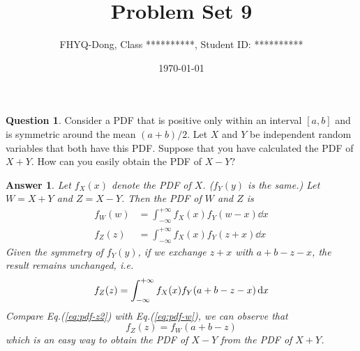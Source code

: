 \documentclass[utf8]{article}
\title{Problem Set 9}
\author{ FHYQ-Dong, Class **********, Student ID: ********** }
\date{\today}
\theoremstyle{definition}%
\newtheorem{question}{Question} %
\theoremstyle{plain}%
\newtheorem{answer}{Answer} %
\begin{document}
\maketitle
\thispagestyle{fancy}

\begin{question}
    Consider a PDF that is positive only within an interval $[a, b]$ and is symmetric around the mean $(a + b)/2$. Let $X$ and $Y$ be independent random variables that both have this PDF. Suppose that you have calculated the PDF of $X + Y$. How can you easily obtain the PDF of $X - Y$?
\end{question}
\begin{answer}
Let $f_{X}(x)$ denote the PDF of $X$. ($f_{Y}(y)$ is the same.) Let $W = X + Y$ and $Z = X - Y$. Then the PDF of $W$ and $Z$ is
\begin{align}
    \label{eq:pdf-w}
    f_{W}(w) &= \int_{-\infty}^{+\infty} f_{X}(x) f_{Y}(w - x) \dd{x} \\ 
    \label{eq:pdf-z1}
    f_{Z}(z) &= \int_{-\infty}^{+\infty} f_{X}(x) f_{Y}(z + x) \dd{x}
\end{align}
Given the symmetry of $f_{Y}(y)$, if we exchange $z + x$ with $a + b - z - x$, the result remains unchanged, i.e.
\begin{equation}
    \label{eq:pdf-z2}
    f_{Z}(z) = \int_{-\infty}^{+\infty} f_{X}(x) f_{Y}\qty(a + b - z - x) \dd{x}
\end{equation}
Compare Eq.(\ref{eq:pdf-z2}) with Eq.(\ref{eq:pdf-w}), we can observe that
\begin{equation}
    f_{Z}(z) = f_{W}(a + b - z)
\end{equation}
which is an easy way to obtain the PDF of $X - Y$ from the PDF of $X + Y$.
\end{answer}
\end{document}
